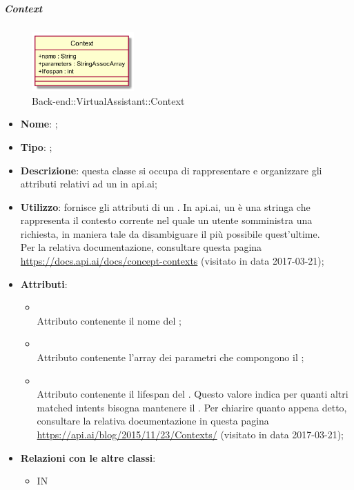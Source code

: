\hypertarget{Context_label}{\subparagraph{Context}}
\begin{figure}[h]
	\centering
	\includegraphics[width=0.35\textwidth,height=\textheight,keepaspectratio]{images/ClassContext.png}
	\caption{Back-end::VirtualAssistant::Context}
\end{figure}
\begin{itemize}
	\item \textbf{Nome}: ;
	\item \textbf{Tipo}: ;
	\item \textbf{Descrizione}: questa classe si occupa di rappresentare e organizzare gli attributi relativi ad un  in api.ai;
	\item \textbf{Utilizzo}: fornisce gli attributi di un .
In api.ai, un  è una stringa che rappresenta il contesto corrente nel quale un utente somministra una richiesta, in maniera tale da disambiguare il più possibile quest'ultime. \\
Per la relativa documentazione, consultare questa pagina \\ \url{https://docs.api.ai/docs/concept-contexts} (visitato in data 2017-03-21);
	\item \textbf{Attributi}:
	\begin{itemize}
		\item[]  \\
		Attributo contenente il nome del ;
		\item[]  \\
		Attributo contenente l'array dei parametri che compongono il ;
		\item[]  \\
		Attributo contenente il lifespan del .
Questo valore indica per quanti altri matched intents bisogna mantenere il .
Per chiarire quanto appena detto, consultare la relativa documentazione in questa pagina \url{https://api.ai/blog/2015/11/23/Contexts/}  (visitato in data 2017-03-21);
	\end{itemize}
	\item \textbf{Relazioni con le altre classi}:
	\begin{itemize}
		\item IN \hyperlink{ProcessingResult_label}{}
	\end{itemize}
\end{itemize}
\FloatBarrier

